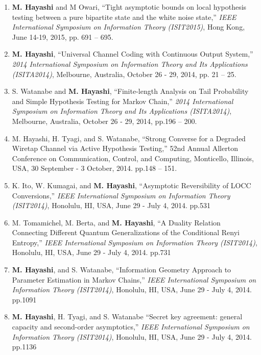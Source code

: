 \documentclass[a4paper,12pt,oneside]{article}
\begin{document}
\begin{enumerate}
    \item
    \textbf{M. Hayashi} and M Owari, 
    ``Tight asymptotic bounds on local hypothesis testing between a pure bipartite state and the white noise state,'' 
    {\em IEEE International Symposium on Information Theory (ISIT2015)},
    Hong Kong, June 14-19, 2015, pp. 691 -- 695.
    
    \item
    \textbf{M. Hayashi},
    ``Universal Channel Coding with Continuous Output System,'' 
    {\em 2014 International Symposium on Information Theory and Its Applications (ISITA2014)}, Melbourne, Australia, October 26 - 29, 2014, pp. 21 -- 25.
    
    \item
    S. Watanabe and \textbf{M. Hayashi},
    ``Finite-length Analysis on Tail Probability and Simple Hypothesis Testing for Markov Chain,'' 
    {\em 2014 International Symposium on Information Theory and Its Applications (ISITA2014)}, Melbourne, Australia, October 26 - 29, 2014, pp.196 -- 200.
    
    \item
    M. Hayashi, H. Tyagi, and S. Watanabe, ``Strong Converse for a Degraded Wiretap Channel via Active Hypothesis Testing,'' 52nd Annual Allerton Conference on Communication, Control, and Computing, Monticello, Illinois, USA, 30 September - 3 October, 2014. pp.148 -- 151.
    
    \item
    K. Ito, W. Kumagai, and \textbf{M. Hayashi}, 
    ``Asymptotic Reversibility of LOCC Conversions,'' 
    {\em IEEE International Symposium on Information Theory (ISIT2014)}, Honolulu, HI, USA, June 29 - July 4, 
    2014. pp.531
    
    \item
    M. Tomamichel, M. Berta, and \textbf{M. Hayashi}, 
    ``A Duality Relation Connecting Different Quantum Generalizations of the Conditional Renyi Entropy,'' 
    {\em IEEE International Symposium on Information Theory (ISIT2014)}, 
    Honolulu, HI, USA, June 29 - July 4, 2014. pp.731
    
    \item
    \textbf{M. Hayashi}, and S. Watanabe, 
    ``Information Geometry Approach to Parameter Estimation in Markov Chains,'' {\em IEEE International Symposium on Information Theory (ISIT2014)}, Honolulu, HI, USA, June 29 - July 4, 2014. pp.1091
    
    \item
    \textbf{M. Hayashi}, H. Tyagi, and S. Watanabe 
    ``Secret key agreement: general capacity and second-order asymptotics,'' 
    {\em IEEE International Symposium on Information Theory (ISIT2014)}, Honolulu, HI, USA, June 29 - July 4, 2014. pp.1136
    

\end{enumerate}
\end{document}
